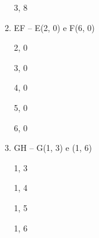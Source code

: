\begin{enumerate}
\begin{enumerate}[label=\alph*.]
						 3, 8
									
					\item EF – E(2, 0) e F(6, 0)
					
						2, 0
						
						3, 0
						
						4, 0
						
						5, 0
						
						6, 0
									
					\item   GH – G(1, 3) e (1, 6)
									
                      1, 3
                      
                      1, 4
                      
                      1, 5
                      
                      1, 6
									
				\end{enumerate}
	
	\end{enumerate}
	
\newpage
